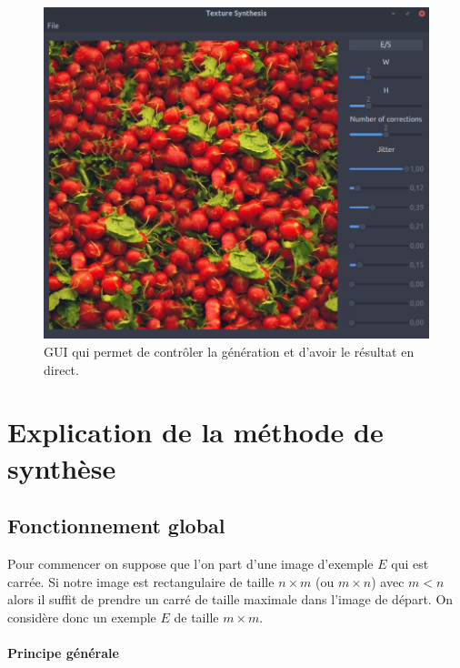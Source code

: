 \documentclass[12pt]{article}
\begin{document}
\begin{figure}
	\centering
	\includegraphics[scale=0.35]{gui.png}
	\captionsetup{justification=centering}
	\caption{GUI qui permet de contrôler la génération et d'avoir le résultat en direct.}
	\label{gui}
\end{figure}

\section{Explication de la méthode de synthèse}

\subsection{Fonctionnement global}

Pour commencer on suppose que l'on part d'une image d'exemple $E$ qui est carrée. Si notre image est rectangulaire de taille $n\times m$ (ou $m\times n$) avec $m<n$ alors il suffit de prendre un carré de taille maximale dans l'image de départ. On considère donc un exemple $E$ de taille $m \times m$.

\paragraph{Principe générale}
\end{document}
